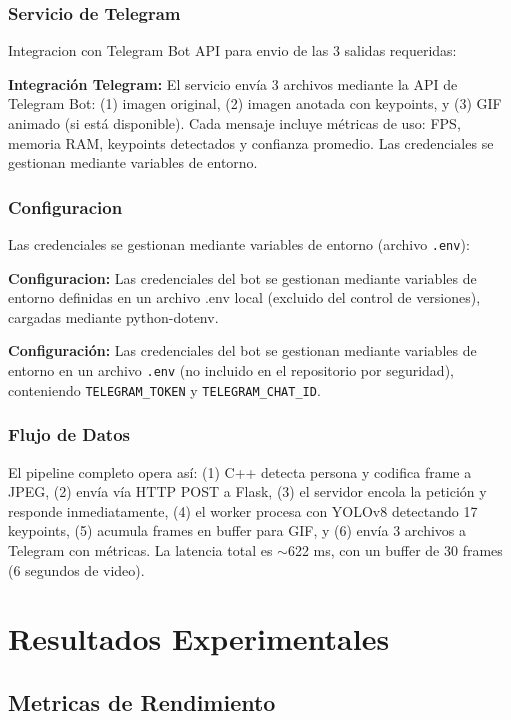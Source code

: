 \documentclass[conference]{IEEEtran}
\begin{document}
\subsubsection{Servicio de Telegram}

Integracion con Telegram Bot API para envio de las 3 salidas requeridas:

\textbf{Integración Telegram:} El servicio envía 3 archivos mediante la API de Telegram Bot: (1) imagen original, (2) imagen anotada con keypoints, y (3) GIF animado (si está disponible). Cada mensaje incluye métricas de uso: FPS, memoria RAM, keypoints detectados y confianza promedio. Las credenciales se gestionan mediante variables de entorno.

\subsubsection{Configuracion}

Las credenciales se gestionan mediante variables de entorno (archivo \texttt{.env}):

\textbf{Configuracion:} Las credenciales del bot se gestionan mediante variables de entorno definidas en un archivo .env local (excluido del control de versiones), cargadas mediante python-dotenv.

\textbf{Configuración:} Las credenciales del bot se gestionan mediante variables de entorno en un archivo \texttt{.env} (no incluido en el repositorio por seguridad), conteniendo \texttt{TELEGRAM\_TOKEN} y \texttt{TELEGRAM\_CHAT\_ID}.

\subsubsection{Flujo de Datos}

El pipeline completo opera así: (1) C++ detecta persona y codifica frame a JPEG, (2) envía vía HTTP POST a Flask, (3) el servidor encola la petición y responde inmediatamente, (4) el worker procesa con YOLOv8 detectando 17 keypoints, (5) acumula frames en buffer para GIF, y (6) envía 3 archivos a Telegram con métricas. La latencia total es $\sim$622 ms, con un buffer de 30 frames (6 segundos de video).

\section{Resultados Experimentales}

\subsection{Metricas de Rendimiento}
\end{document}

